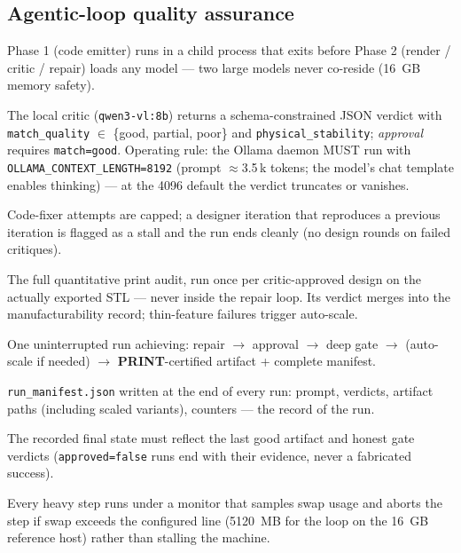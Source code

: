 \documentclass[11pt]{article}
\newcommand{\term}[1]{\textbf{#1}}
\begin{document}
\subsection{Agentic-loop quality assurance}
\begin{description}[style=nextline,itemsep=0.35em]
  \item[Two-phase split] Phase 1 (code emitter) runs in a child process that exits before
    Phase 2 (render / critic / repair) loads any model --- two large models never co-reside
    (16~GB memory safety).
  \item[Critic approval] The local critic (\texttt{qwen3-vl:8b}) returns a schema-constrained JSON
    verdict with \texttt{match\_quality} $\in$ \{good, partial, poor\} and \texttt{physical\_stability};
    \emph{approval} requires \texttt{match=good}. Operating rule: the Ollama daemon MUST run with
    \texttt{OLLAMA\_CONTEXT\_LENGTH=8192} (prompt $\approx$3.5\,k tokens; the model's chat template
    enables thinking) --- at the 4096 default the verdict truncates or vanishes.
  \item[Repair attempt / stall guard] Code-fixer attempts are capped; a designer iteration that
    reproduces a previous iteration is flagged as a stall and the run ends cleanly (no design
    rounds on failed critiques).
  \item[Deep gate] The full quantitative print audit, run once per critic-approved design on the
    actually exported STL --- never inside the repair loop. Its verdict merges into the
    manufacturability record; thin-feature failures trigger auto-scale.
  \item[Convergence event] One uninterrupted run achieving:
    repair $\rightarrow$ approval $\rightarrow$ deep gate $\rightarrow$ (auto-scale if needed)
    $\rightarrow$ \term{PRINT}-certified artifact + complete manifest.
  \item[Run manifest] \texttt{run\_manifest.json} written at the end of every run: prompt,
    verdicts, artifact paths (including scaled variants), counters --- the record of the run.
  \item[Terminal-state truthfulness] The recorded final state must reflect the last good
    artifact and honest gate verdicts (\texttt{approved=false} runs end with their evidence, never
    a fabricated success).
  \item[Swap watchdog] Every heavy step runs under a monitor that samples swap usage and aborts
    the step if swap exceeds the configured line (5120~MB for the loop on the 16~GB reference host)
    rather than stalling the machine.
\end{description}
\end{document}

